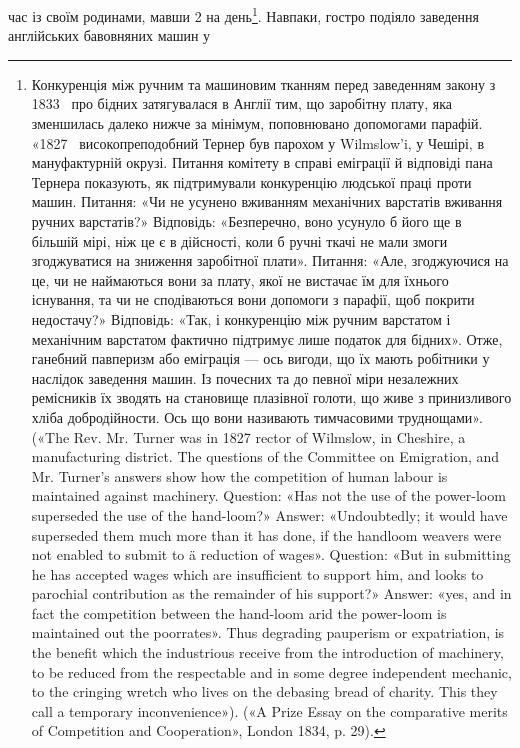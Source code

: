 час із своїм родинами, мавши 2 на день\footnote{
Конкуренція між ручним та машиновим тканням перед заведенням
закону з 1833~ про бідних затягувалася в Англії тим, що заробітну
плату, яка зменшилась далеко нижче за мінімум, поповнювано
допомогами парафій. «1827~ високопреподобний Тернер був парохом у
Wilmslow’i, у Чешірі, в мануфактурній окрузі. Питання комітету в справі
еміграції й відповіді пана Тернера показують, як підтримували конкуренцію
людської праці проти машин. Питання: «Чи не усунено вживанням
механічних варстатів вживання ручних варстатів?» Відповідь: «Безперечно,
воно усунуло б його ще в більшій мірі, ніж це є в дійсності, коли б
ручні ткачі не мали змоги згоджуватися на зниження заробітної плати».
Питання: «Але, згоджуючися на це, чи не наймаються вони за плату,
якої не вистачає їм для їхнього існування, та чи не сподіваються вони
допомоги з парафії, щоб покрити недостачу?» Відповідь: «Так, і конкуренцію
між ручним варстатом і механічним варстатом фактично підтримує
лише податок для бідних». Отже, ганебний павперизм або еміграція — ось
вигоди, що їх мають робітники у наслідок заведення машин. Із почесних
та до певної міри незалежних ремісників їх зводять на становище плазівної
голоти, що живе з принизливого хліба добродійности. Ось що
вони називають тимчасовими труднощами». («The Rev. Mr. Turner was
in 1827 rector of Wilmslow, in Cheshire, a manufacturing district. The questions
of the Committee on Emigration, and Mr. Turner’s answers show
how the competition of human labour is maintained against machinery.
Question: «Has not the use of the power-loom superseded the use of the
hand-loom?» Answer: «Undoubtedly; it would have superseded them much
more than it has done, if the handloom weavers were not enabled to submit
to ä reduction of wages». Question: «But in submitting he has accepted wages
which are insufficient to support him, and looks to parochial contribution
as the remainder of his support?» Answer: «yes, and in fact the competition
between the hand-loom arid the power-loom is maintained out the poorrates».
Thus degrading pauperism or expatriation, is the benefit which the
industrious receive from the introduction of machinery, to be reduced from
the respectable and in some degree independent mechanic, to the cringing
wretch who lives on the debasing bread of charity. This they call a temporary
inconvenience»). («A Prize Essay on the comparative merits of Competition
and Cooperation», London 1834, p. 29).
}. Навпаки, гостро подіяло заведення англійських бавовняних машин у
